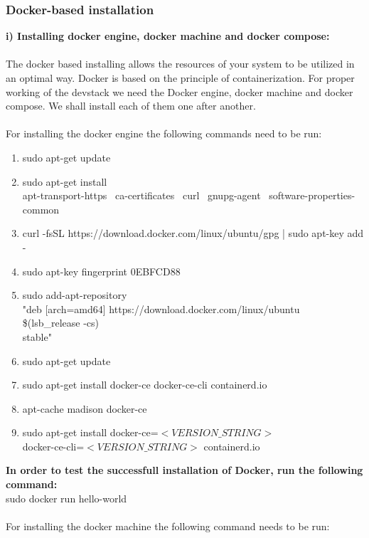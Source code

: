 \documentclass[12pt]{article}
\begin{document}
\subsubsection{Docker-based installation}
	\textbf{i) Installing docker engine, docker machine and docker compose:}
	\\ \\
	The docker based installing allows the resources of your system to be utilized in an optimal way. Docker is based on the principle of containerization. For proper working of the devstack we need the Docker engine, docker machine and docker compose. We shall install each of them one after another.\\ \\
	For installing the docker engine the following commands need to be run:
	\begin{enumerate}
		\item sudo apt-get update
		\item sudo apt-get install \ \\
		apt-transport-https \
		ca-certificates \
		curl \
		gnupg-agent \
		software-properties-common
		\item curl -fsSL https://download.docker.com/linux/ubuntu/gpg | sudo apt-key add -
		\item sudo apt-key fingerprint 0EBFCD88
		\item sudo add-apt-repository \ \\
		"deb [arch=amd64] https://download.docker.com/linux/ubuntu \ \\
		\$(lsb\_release -cs) \ \\
		stable"
		\item sudo apt-get update
		\item sudo apt-get install docker-ce docker-ce-cli containerd.io
		\item apt-cache madison docker-ce
		\item sudo apt-get install docker-ce=$<VERSION\_STRING>$\\docker-ce-cli=$<VERSION\_STRING>$ containerd.io
	\end{enumerate}
	\textbf{In order to test the successfull installation of Docker, run the following \\command:\\}
	sudo docker run hello-world\\\\
	For installing the docker machine the following command needs to be run:\\ \\
\end{document}
